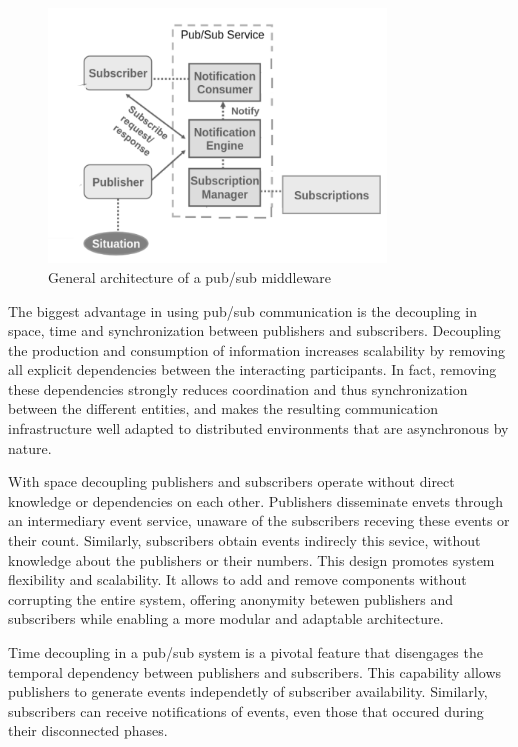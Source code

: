 \begin{figure}[ht]
    \centering
    \includegraphics[width=0.8\textwidth]{Figures/pub_sub_general_architecture.png}
    \caption{General architecture of a pub/sub middleware}
    \label{fig:pub_sub_general_architecture}
\end{figure}

The biggest advantage in using pub/sub communication is the decoupling in
space, time and synchronization between publishers and subscribers.
Decoupling the production and consumption of information increases scalability
by removing all explicit dependencies between the interacting participants.
In fact, removing these dependencies strongly reduces coordination and thus
synchronization between the different entities, and makes the resulting
communication infrastructure well adapted to distributed environments that are
asynchronous by nature.
\cite{Many_faces_of_pub/sub}

With space decoupling publishers and subscribers operate without direct
knowledge or dependencies on each other. Publishers disseminate envets through
an intermediary event service, unaware of the subscribers receving these events
or their count. Similarly, subscribers obtain events indirecly this sevice,
without knowledge about the publishers or their numbers. This design promotes
system flexibility and scalability. It allows to add and remove components
without corrupting the entire system, offering anonymity betewen publishers
and subscribers while enabling a more modular and adaptable architecture.

Time decoupling in a pub/sub system is a pivotal feature that disengages the
temporal dependency between publishers and subscribers. This capability allows
publishers to generate events independetly of subscriber availability.
Similarly, subscribers can receive notifications of events, even those that
occured during their disconnected phases.

